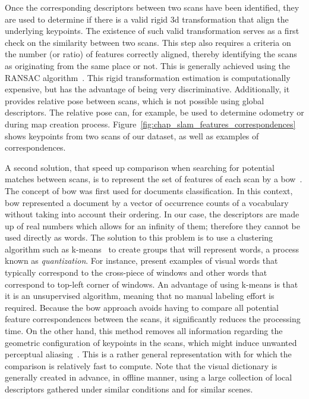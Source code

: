 Once the corresponding descriptors between two scans have been identified, they are used to determine if there is a valid rigid \gls*{3d} transformation that align the underlying keypoints. The existence of such valid transformation serves as a first check on the similarity between two scans. This step also requires a criteria on the number (or ratio) of features correctly aligned, thereby identifying the scans as originating from the same place or not. This is generally achieved using the RANSAC algorithm~\citep{Fischler1981}. This rigid transformation estimation is computationally expensive, but has the advantage of being very discriminative. Additionally, it provides relative pose between scans, which is not possible using global descriptors. The relative pose can, for example, be used to determine odometry or during map creation process. Figure~\ref{fig:chap_slam_features_correspondences} shows keypoints from two scans of our dataset, as well as examples of correspondences.

A second solution, that speed up comparison when searching for potential matches between scans, is to represent the set of features of each scan by a \gls*{bow}~\citep{salton1983mcgill}. The concept of \gls*{bow} was first used for documents classification. In this context, \gls*{bow} represented a document by a vector of occurrence counts of a vocabulary without taking into account their ordering. In our case, the descriptors are made up of real numbers which allows for an infinity of them; therefore they cannot be used directly as words. The solution to this problem is to use a clustering algorithm such as k-means~\citep{MacQueen1967} to create groups that will represent words, a process known as \emph{quantization}. For instance, \citet{Cummins2008} present examples of visual words that typically correspond to the cross-piece of windows and other words that correspond to top-left corner of windows. An advantage of using k-means is that it is an unsupervised algorithm, meaning that no manual labeling effort is required. Because the \gls*{bow} approach avoids having to compare all potential feature correspondences between the scans, it significantly reduces the processing time. On the other hand, this method removes all information regarding the geometric configuration of keypoints in the scans, which might induce unwanted perceptual aliasing~\citep{Mariottini2011}. This is a rather general representation with for which the comparison is relatively fast to compute. Note that the visual dictionary is generally created in advance, in offline manner, using a large collection of local descriptors gathered under similar conditions and for similar scenes.

